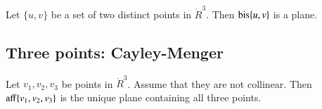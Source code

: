 \begin{tarskidata}
\begin{tarski}
\begin{proved}
\swallowed\end{proved}
\end{tarski}





\begin{tarski}

\begin{lemma}
Let $\{u,v\}$ be a set of two distinct points in 
$\ring{R}^3$.  Then ${\operatorname{bis}}\{u,v\}$ is a plane.
\end{lemma}

\begin{proved}
\swallowed\end{proved}
\end{tarski}






\begin{tarski}
\section{Three points: Cayley-Menger}

\begin{lemma}
	Let $v_1,v_2,v_3$ be points in $\ring{R}^3$.  Assume that they are not collinear.
Then ${\operatorname{aff}}\{v_1,v_2,v_3\}$ is the unique plane containing all three points.
\end{lemma}

\begin{proved}
\swallowed\end{proved}
\end{tarski}




%
%




\end{tarskidata}
